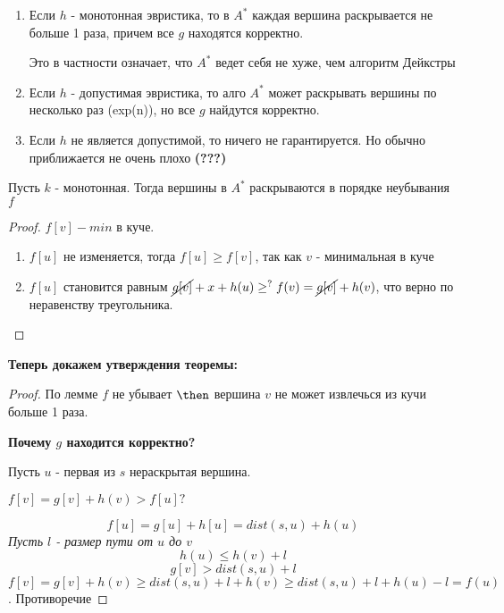 \begin{theorem}
  \text{}

  \begin{enumerate}
    \item Если $h$ - монотонная эвристика, то в $A^*$ каждая вершина раскрывается не больше 1 раза, причем все $g$ находятся корректно.
  
  Это в частности означает, что $A^*$ ведет себя не хуже, чем алгоритм Дейкстры

  \item Если $h$ - допустимая эвристика, то алго $A^*$ может раскрывать вершины по несколько раз (exp(n)), но все $g$ найдутся корректно.
  \item Если $h$ не является допустимой, то ничего не гарантируется. Но обычно приближается не очень плохо \textbf{(???)}
  \end{enumerate}
\end{theorem}

\begin{lemma}
  Пусть $k$ - монотонная. Тогда вершины в $A^*$ раскрываются в порядке неубывания $f$
\end{lemma}

\begin{proof}
  $f[v] - min$ в куче. 
  \begin{enumerate}
    \item $f[u]$ не изменяется, тогда $f[u] \ge f[v]$, так как $v$ - минимальная в куче
    \item $f[u]$ становится равным $\cancel{g[v]} + x + h(u) \ge^{?} f(v) = \cancel{g[v]} + h(v)$, что верно по неравенству треугольника.
  \end{enumerate}
\end{proof}

\textbf{Теперь докажем утверждения теоремы:}

\begin{proof}
  По лемме $f$ не убывает $\then$ вершина $v$ не может извлечься из кучи больше 1 раза.

  \textbf{Почему $g$ находится корректно?}

  Пусть $u$ - первая из $s$ нераскрытая вершина.

  $f[v] = g[v] + h(v) > f[u]?$

  $$f[u] = g[u] + h[u] = dist(s, u) + h(u)$$
  \textit{Пусть $l$ - размер пути от $u$ до $v$}
  $$h(u) \le h(v) + l$$
  $$g[v] > dist(s, u) + l$$
  $f[v] = g[v] + h(v) \ge dist(s, u) + l + h(v) \ge dist(s, u) + l + h(u) - l = f(u)$. Противоречие
\end{proof}

